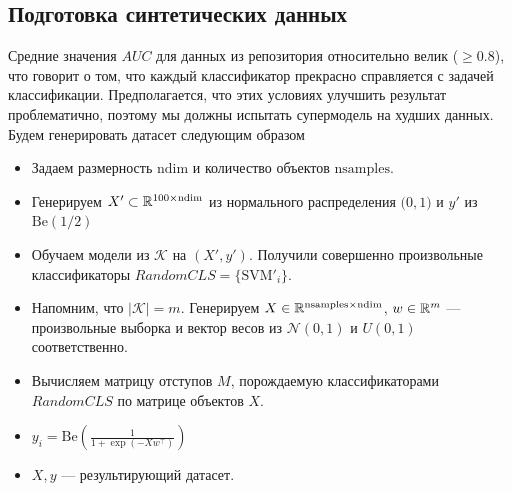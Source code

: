 \documentclass[12pt,twoside]{article}
\theoremstyle{plain}
\theoremstyle{remark}
\theoremstyle{definition}
\begin{document}
\subsection{Подготовка синтетических данных}

Средние значения $AUC$ для данных из репозитория относительно велик ($\geq 0.8$), что говорит о том, что каждый классификатор прекрасно справляется с задачей классификации. Предполагается, что этих условиях улучшить результат проблематично, поэтому мы должны испытать супермодель на худших данных. Будем генерировать датасет следующим образом

\begin{itemize}
	\item Задаем размерность $\mathrm{ndim}$ и количество объектов $\mathrm{nsamples}$.
	\item Генерируем $X' \subset \R^{100\times \mathrm{ndim}}$ из нормального распределения $\mathcal(0, 1)$ и $y'$ из $\mathrm{Be}(1/2)$
	\item Обучаем модели из $\mathcal{K}$ на $(X', y')$. Получили совершенно произвольные классификаторы $RandomCLS = \{\mathrm{SVM}'_i\}$.
	\item Напомним, что $|\mathcal{K}| = m$. Генерируем $X \in \R^{\mathrm{nsamples} \times \mathrm{ndim}}$, $w \in \mathbb{R}^{m}$ --- произвольные выборка и вектор весов из $\mathcal{N}(0, 1)$ и $U(0, 1)$ соответственно.
	\item Вычисляем матрицу отступов $M$, порождаемую классификаторами $RandomCLS$ по матрице объектов $X$.
	\item $y_i = \mathrm{Be}(\frac{1}{1 + \exp(-Xw^\intercal)})$
	\item $X, y$ --- результирующий датасет.
\end{itemize}
\end{document}
